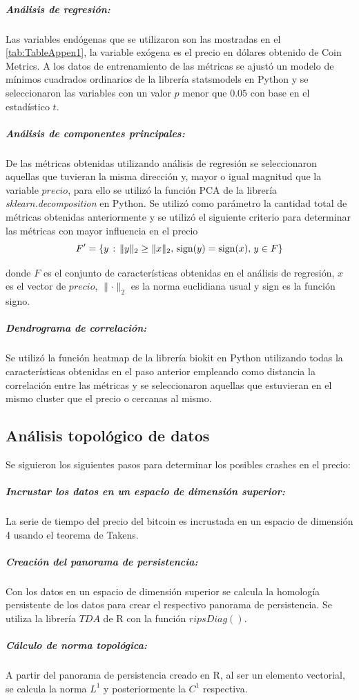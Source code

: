 \subparagraph{Análisis de regresión:}
\label{AR}
Las variables endógenas que se utilizaron son las mostradas en el \autoref{tab:TableAppen1}, la variable exógena es el precio en dólares obtenido de Coin Metrics. 
A los datos de entrenamiento de las métricas se ajustó un modelo de mínimos cuadrados ordinarios de la librería statsmodels en Python y se seleccionaron las variables con un valor $p$ menor que $0.05$ con base en el estadístico $t$.


\subparagraph{Análisis de componentes principales:}
\label{PCA}

De las métricas obtenidas utilizando análisis de regresión se seleccionaron aquellas que tuvieran la misma dirección y, mayor o igual magnitud que la variable $precio$, para ello se utilizó la función PCA de la librería \emph{sklearn.decomposition} en Python.
Se utilizó como parámetro la cantidad total de métricas obtenidas anteriormente y se utilizó el siguiente criterio para determinar las métricas con mayor influencia en el precio
\[ F^{\prime} = \{ y \hspace{0.5mm}:\hspace{0.5mm} \lVert y \rVert_2 \geq \lVert x \rVert_2,\hspace{0.5mm} \textrm{sign}(y) = \textrm{sign}(x),\hspace{0.5mm}y \in F\} \]

donde $F$ es el conjunto de características obtenidas en el análisis de regresión, $x$ es el vector de $precio$, $\lVert \cdot \rVert_2$ es la norma euclidiana usual y sign es la función signo.

\subparagraph{Dendrograma de correlación:}
Se utilizó la función heatmap de la librería biokit en Python utilizando todas la características obtenidas en el paso anterior empleando como distancia la correlación entre las métricas y se seleccionaron aquellas que estuvieran en el mismo cluster que el precio o cercanas al mismo.

\subsection{Análisis topológico de datos}
Se siguieron los siguientes pasos para determinar los posibles crashes en el precio:

\subparagraph{Incrustar los datos en un espacio de dimensión superior:} La serie de tiempo del precio del bitcoin es incrustada en un espacio de dimensión 4 usando el teorema de Takens.
\subparagraph{Creación del panorama de persistencia:} Con los datos en un espacio de dimensión superior se calcula la homología persistente de los datos para crear el respectivo panorama de persistencia. Se utiliza la librería $TDA$ de R con la función $ripsDiag()$.
\subparagraph{Cálculo de norma topológica:} A partir del panorama de persistencia creado en R, al ser un elemento vectorial, se calcula la norma $L^1$ y posteriormente la $C^1$ respectiva.

